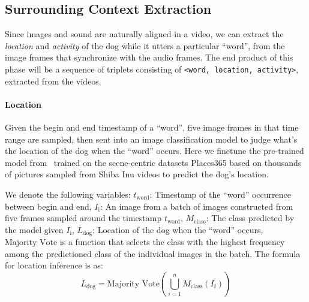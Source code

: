 \subsection{Surrounding Context Extraction}
\label{sec:infer_context}
Since images and sound are naturally aligned in a video,  we can
extract the \textit{location} and \textit{activity} of the dog while it utters 
a particular ``word'', from the image frames that synchronize with the audio 
frames.
The end product of this phase will be a sequence of triplets 
consisting of \texttt{<word, location, activity>}, extracted from the videos. 

 \paragraph{Location} %
Given the begin and end timestamp of a ``word'', five image frames in that time range 
are sampled, then sent into an image classification model to judge 
what's the location of the dog when the ``word'' occurs. Here we finetune the pre-trained model 
from~\cite{zhou2017places} trained on the scene-centric datasets 
Places365 based on thousands of pictures sampled from Shiba Inu videos to predict the dog's location.
 
We denote the following variables:
$t_{\text{word}}$: Timestamp of the ``word'' occurrence between begin and end, %
$I_{\text{i}}$: An image from a batch of images constructed from five frames sampled around the timestamp $t_{\text{word}}$,
$M_{\text{class}}$: The class predicted by the model given $I_{\text{i}}$,
$L_{\text{dog}}$: Location of the dog when the ``word'' occurs,
$\text{Majority Vote}$ is a function that selects the class with the highest frequency among the predictioned class of the individual images in the batch.
The formula for location inference is as:
\begin{equation}
L_{\text{dog}} = \text{Majority Vote}\left(\bigcup_{i=1}^{n} M_{\text{class}}(I_i)\right)
\end{equation}



